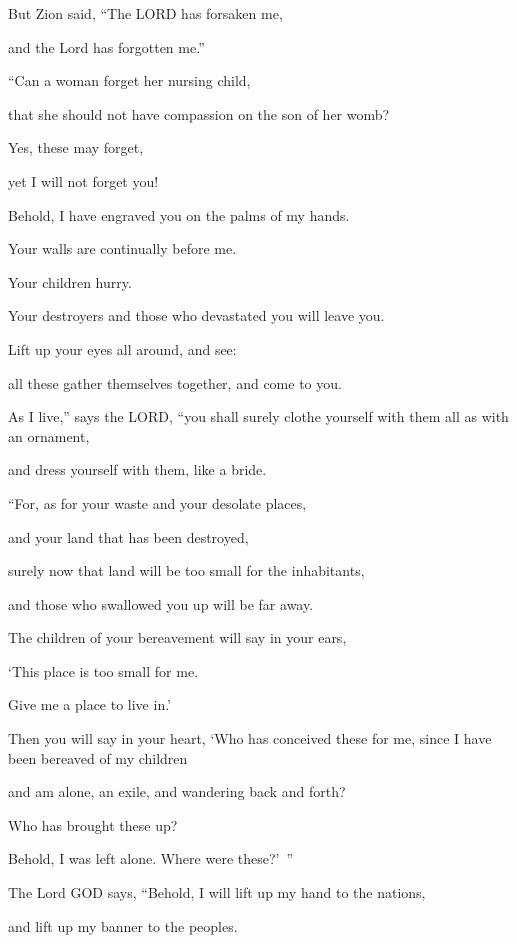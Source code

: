 \vspace{\baselineskip} \myverse{}But Zion said, “The LORD has forsaken me,

and the Lord has forgotten me.”

\myverse{}“Can a woman forget her nursing child,

that she should not have compassion on the son of her womb?

Yes, these may forget,

yet I will not forget you!

\myverse{}Behold, I have engraved you on the palms of my hands.

Your walls are continually before me.

\myverse{}Your children hurry.

Your destroyers and those who devastated you will leave you.

\myverse{}Lift up your eyes all around, and see:

all these gather themselves together, and come to you.

As I live,” says the LORD, “you shall surely clothe yourself with them all as with an ornament,

and dress yourself with them, like a bride.

\myverse{}“For, as for your waste and your desolate places,

and your land that has been destroyed,

surely now that land will be too small for the inhabitants,

and those who swallowed you up will be far away.

\myverse{}The children of your bereavement will say in your ears,

‘This place is too small for me.

Give me a place to live in.’

\myverse{}Then you will say in your heart, ‘Who has conceived these for
me, since I have been bereaved of my children

and am alone, an exile, and wandering back and forth?

Who has brought these up?

Behold, I was left alone. Where were these?’ ”


\vspace{\baselineskip} \myverse{}The Lord GOD says, “Behold, I will lift up my hand to the nations,

and lift up my banner to the peoples.


